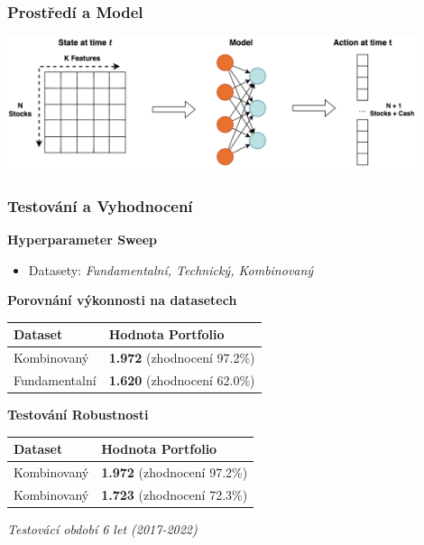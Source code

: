 \begin{frame}
    \frametitle{Prostředí a Model}

    \begin{center}
        \centering
        \includegraphics[width=0.9\textwidth]{img/env}
    \end{center}
\end{frame}

\begin{frame}
    \frametitle{Testování a Vyhodnocení}
    \textbf{Hyperparameter Sweep}
    \begin{itemize}
        \item Datasety: \textit{Fundamentalní, Technický, Kombinovaný}
    \end{itemize}
    \textbf{Porovnání výkonnosti na datasetech}
    \begin{table}
        \centering
        {\footnotesize
            \begin{tabular}{|ll|}
                \hline
                \textbf{Dataset}                          & \textbf{Hodnota Portfolio}                                     \\ \hline
                \textcolor[RGB]{50,150,50}{Kombinovaný}   & \textcolor[RGB]{50,150,50}{\textbf{1.972} (zhodnocení 97.2\%)} \\
                \textcolor[RGB]{150,50,50}{Fundamentalní} & \textcolor[RGB]{150,50,50}{\textbf{1.620} (zhodnocení 62.0\%)} \\ \hline
            \end{tabular}
        }
        \label{tab:datasets-comparison}
    \end{table}
    \textbf{Testování Robustnosti}
    \begin{table}[H]
        \centering
        {\footnotesize
            \begin{tabular}{|ll|}
                \hline
                \textbf{Dataset}                        & \textbf{Hodnota Portfolio}                                     \\ \hline
                \textcolor[RGB]{50,150,50}{Kombinovaný} & \textcolor[RGB]{50,150,50}{\textbf{1.972} (zhodnocení 97.2\%)} \\
                \textcolor[RGB]{150,50,50}{Kombinovaný} & \textcolor[RGB]{150,50,50}{\textbf{1.723} (zhodnocení 72.3\%)} \\ \hline
            \end{tabular}
        }
    \end{table}
    \vfill
    \textit{\small Testovácí období 6 let (2017-2022)}
\end{frame}

